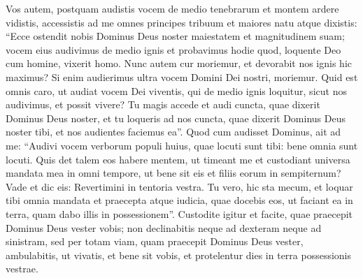 \begin{biblechapter}
\begin{biblechapter}
\begin{biblechapter}
\begin{biblechapter}
\begin{biblechapter}
 \verse Vos autem, postquam audistis vocem de medio tenebrarum et montem ardere vidistis, accessistis ad me omnes principes tribuum et maiores natu 
\verse atque dixistis: “Ecce ostendit nobis Dominus Deus noster maiestatem et magnitudinem suam; vocem eius audivimus de medio ignis et probavimus hodie quod, loquente Deo cum homine, vixerit homo. 
\verse Nunc autem cur moriemur, et devorabit nos ignis hic maximus? Si enim audierimus ultra vocem Domini Dei nostri, moriemur. 
\verse Quid est omnis caro, ut audiat vocem Dei viventis, qui de medio ignis loquitur, sicut nos audivimus, et possit vivere? 
\verse Tu magis accede et audi cuncta, quae dixerit Dominus Deus noster, et tu loqueris ad nos cuncta, quae dixerit Dominus Deus noster tibi, et nos audientes faciemus ea”.
 \verse Quod cum audisset Dominus, ait ad me: “Audivi vocem verborum populi huius, quae locuti sunt tibi: bene omnia sunt locuti. 
\verse Quis det talem eos habere mentem, ut timeant me et custodiant universa mandata mea in omni tempore, ut bene sit eis et filiis eorum in sempiternum? 
\verse Vade et dic eis: Revertimini in tentoria vestra. 
\verse Tu vero, hic sta mecum, et loquar tibi omnia mandata et praecepta atque iudicia, quae docebis eos, ut faciant ea in terra, quam dabo illis in possessionem”. 
\verse Custodite igitur et facite, quae praecepit Dominus Deus vester vobis; non declinabitis neque ad dexteram neque ad sinistram, 
\verse sed per totam viam, quam praecepit Dominus Deus vester, ambulabitis, ut vivatis, et bene sit vobis, et protelentur dies in terra possessionis vestrae.
 

\end{biblechapter}
\end{biblechapter}
\end{biblechapter}
\end{biblechapter}
\end{biblechapter}
